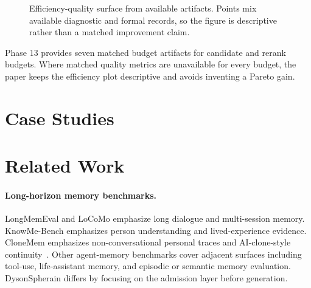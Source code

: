 \documentclass[10pt]{article}
\newcommand{\system}{DysonSpherain}
\begin{document}
\begin{figure}[t]
  \centering
  
  \caption{Efficiency-quality surface from available artifacts. Points mix
  available diagnostic and formal records, so the figure is descriptive rather
  than a matched improvement claim.}
  \label{fig:efficiency-pareto}
\end{figure}

Phase 13 provides seven matched budget artifacts for candidate and rerank
budgets. Where matched quality metrics are unavailable for every budget, the
paper keeps the efficiency plot descriptive and avoids inventing a Pareto gain.

\begin{table}[t]
  \centering
  \caption{CloneMem full-run efficiency update. The April 30 run is included as
  runtime evidence only: it uses the official embedding/vector path and covers
  the full CloneMem question set, but it does not change the paper's quality
  conclusion because candidate admission remains low.}
  \label{tab:clonemem-efficiency}
  
\end{table}



\section{Case Studies}

\begin{table}[t]
  \centering
  \caption{Diagnostic case-study examples extracted from JSONL artifacts.}
  \label{tab:case-studies}
  
\end{table}



\section{Related Work}

\paragraph{Long-horizon memory benchmarks.}
LongMemEval and LoCoMo emphasize long dialogue and multi-session memory.
KnowMe-Bench emphasizes person understanding and lived-experience evidence.
CloneMem emphasizes non-conversational personal traces and AI-clone-style
continuity~\cite{wu2024longmemeval,maharana2024locomo,wu2026knowme,hu2026clonemem}.
Other agent-memory benchmarks cover adjacent surfaces including tool-use,
life-assistant memory, and episodic or semantic memory evaluation. \system{}
differs by focusing on the admission layer before generation.
\end{document}
